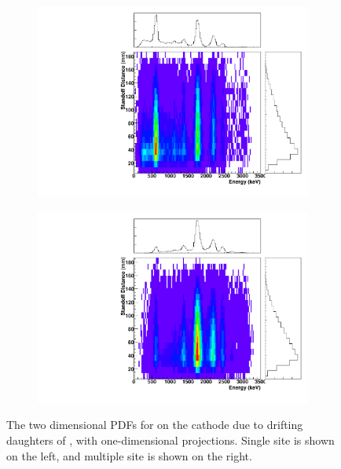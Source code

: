 \documentclass[herrin-thesis.tex]{subfiles}
\begin{document}
\begin{figure}[hp]
\centering
	\begin{subfigure}[b]{0.35\textwidth}
	\centering
	\includegraphics[width=\textwidth]{./plots/PDFs/analysis_pdf_CathodeSurf_Bi214_nochain_ss.pdf}
\end{subfigure}\hspace{0.1\textwidth}%
\begin{subfigure}[b]{0.35\textwidth}
	\centering
	\includegraphics[width=1\textwidth]{./plots/PDFs/analysis_pdf_CathodeSurf_Bi214_nochain_ms.pdf}
	\end{subfigure}
\caption[PDF for  on the cathode]{The two dimensional PDFs for  on the cathode due to drifting daughters of , with one-dimensional projections. Single site is shown on the left, and multiple site is shown on the right.}
\label{fig:analysis_pdf_CathodeSurf_Bi214_nochain}
\end{figure}
\end{document}
